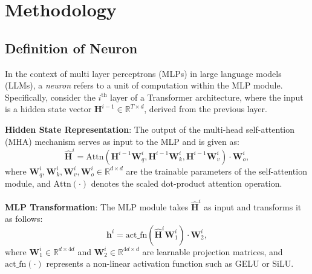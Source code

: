 \chapter{Methodology}\singlespacing %

\label{Chapter3} %



\section{Definition of Neuron}

In the context of multi layer perceptrons (MLPs) in large language models (LLMs), a \textit{neuron} refers to a unit of computation within the MLP module. Specifically, consider the $i^\text{th}$ layer of a Transformer architecture, where the input is a hidden state vector $\mathbf{H}^{i-1} \in \mathbb{R}^{T \times d}$, derived from the previous layer.

\textbf{Hidden State Representation}:  The output of the multi-head self-attention (MHA) mechanism serves as input to the MLP and is given as:
\begin{equation}
\hat{\mathbf{H}}^i = \text{Attn}(\mathbf{H}^{i-1}\mathbf{W}_q^i, \mathbf{H}^{i-1}\mathbf{W}_k^i, \mathbf{H}^{i-1}\mathbf{W}_v^i) \cdot \mathbf{W}_o^i,
\end{equation}
where $\mathbf{W}_q^i, \mathbf{W}_k^i, \mathbf{W}_v^i, \mathbf{W}_o^i \in \mathbb{R}^{d \times d}$ are the trainable parameters of the self-attention module, and $\text{Attn}(\cdot)$ denotes the scaled dot-product attention operation.

\textbf{MLP Transformation}: The MLP module takes $\hat{\mathbf{H}}^i$ as input and transforms it as follows:
\begin{equation}
\mathbf{h}^i = \text{act\_fn}(\hat{\mathbf{H}}^i \mathbf{W}_1^i) \cdot \mathbf{W}_2^i,
\end{equation}
where $\mathbf{W}_1^i \in \mathbb{R}^{d \times 4d}$ and $\mathbf{W}_2^i \in \mathbb{R}^{4d \times d}$ are learnable projection matrices, and $\text{act\_fn}(\cdot)$ represents a non-linear activation function such as GELU or SiLU.

